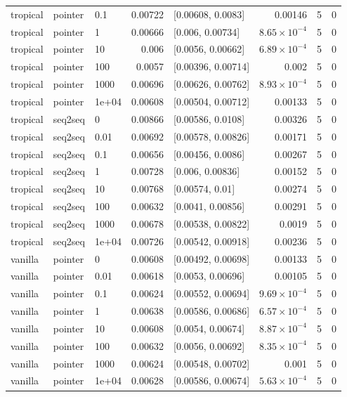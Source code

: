 \documentclass[10pt]{article}
\begin{document}
{\begin{longtable}{lllrlrrr}
tropical & pointer & 0.1 & 0.00722 & [0.00608, 0.0083] & 0.00146 & 5 & 0\\
tropical & pointer & 1 & 0.00666 & [0.006, 0.00734] & $8.65\times10^{-4}$ & 5 & 0\\
tropical & pointer & 10 & 0.006 & [0.0056, 0.00662] & $6.89\times10^{-4}$ & 5 & 0\\
tropical & pointer & 100 & 0.0057 & [0.00396, 0.00714] & 0.002 & 5 & 0\\
tropical & pointer & 1000 & 0.00696 & [0.00626, 0.00762] & $8.93\times10^{-4}$ & 5 & 0\\
tropical & pointer & 1e+04 & 0.00608 & [0.00504, 0.00712] & 0.00133 & 5 & 0\\
tropical & seq2seq & 0 & 0.00866 & [0.00586, 0.0108] & 0.00326 & 5 & 0\\
tropical & seq2seq & 0.01 & 0.00692 & [0.00578, 0.00826] & 0.00171 & 5 & 0\\
tropical & seq2seq & 0.1 & 0.00656 & [0.00456, 0.0086] & 0.00267 & 5 & 0\\
tropical & seq2seq & 1 & 0.00728 & [0.006, 0.00836] & 0.00152 & 5 & 0\\
tropical & seq2seq & 10 & 0.00768 & [0.00574, 0.01] & 0.00274 & 5 & 0\\
tropical & seq2seq & 100 & 0.00632 & [0.0041, 0.00856] & 0.00291 & 5 & 0\\
tropical & seq2seq & 1000 & 0.00678 & [0.00538, 0.00822] & 0.0019 & 5 & 0\\
tropical & seq2seq & 1e+04 & 0.00726 & [0.00542, 0.00918] & 0.00236 & 5 & 0\\
vanilla & pointer & 0 & 0.00608 & [0.00492, 0.00698] & 0.00133 & 5 & 0\\
vanilla & pointer & 0.01 & 0.00618 & [0.0053, 0.00696] & 0.00105 & 5 & 0\\
vanilla & pointer & 0.1 & 0.00624 & [0.00552, 0.00694] & $9.69\times10^{-4}$ & 5 & 0\\
vanilla & pointer & 1 & 0.00638 & [0.00586, 0.00686] & $6.57\times10^{-4}$ & 5 & 0\\
vanilla & pointer & 10 & 0.00608 & [0.0054, 0.00674] & $8.87\times10^{-4}$ & 5 & 0\\
vanilla & pointer & 100 & 0.00632 & [0.0056, 0.00692] & $8.35\times10^{-4}$ & 5 & 0\\
vanilla & pointer & 1000 & 0.00624 & [0.00548, 0.00702] & 0.001 & 5 & 0\\
vanilla & pointer & 1e+04 & 0.00628 & [0.00586, 0.00674] & $5.63\times10^{-4}$ & 5 & 0\\

\end{longtable}}
\end{document}
